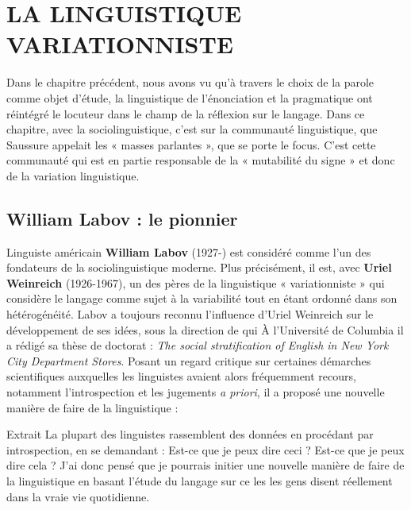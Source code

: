 \section{LA LINGUISTIQUE VARIATIONNISTE}
Dans le chapitre précédent, nous avons vu qu’à travers le choix de la parole comme objet d’étude, la linguistique de l’énonciation et la pragmatique ont réintégré le locuteur dans le champ de la réflexion sur le langage. Dans ce chapitre, avec la sociolinguistique, c’est sur la communauté linguistique, que Saussure appelait les « masses parlantes », que se porte le focus. C’est cette communauté qui est en partie responsable de la « mutabilité du signe » et donc de la variation linguistique.

\subsection{William Labov : le pionnier}
Linguiste américain \textbf{William Labov} (1927-) est considéré comme l’un des fondateurs de la sociolinguistique moderne. Plus précisément, il est, avec \textbf{Uriel Weinreich} (1926-1967), un des pères de la linguistique « variationniste » qui considère le langage comme sujet à la variabilité tout en étant ordonné dans son hétérogénéité. Labov a toujours reconnu l’influence d’Uriel Weinreich sur le développement de ses idées, sous la direction de qui À l’Université de Columbia il a rédigé sa thèse de
doctorat : \textit{The social stratification of English in New York City Department Stores}. Posant un regard critique sur certaines démarches scientifiques auxquelles les linguistes avaient alors fréquemment recours, notamment l’introspection et les jugements \textit{a priori}, il a proposé une nouvelle manière de faire de la linguistique :

\begin{lecture}{Extrait}
La plupart des linguistes rassemblent des données en procédant par introspection, en se demandant : Est-ce que je peux dire ceci ? Est-ce que je peux dire cela ? J’ai donc pensé que je pourrais initier une nouvelle manière de faire de la linguistique en basant l’étude du langage sur ce les les gens disent réellement dans la vraie vie quotidienne.
\end{lecture}


